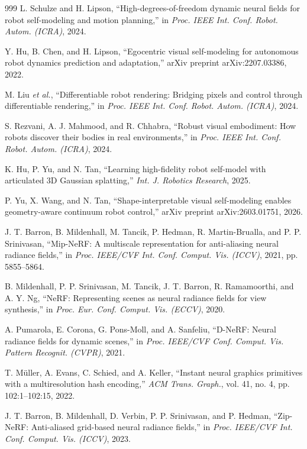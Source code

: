 \documentclass[12pt,a4paper,oneside]{report}
\begin{document}
\begin{thebibliography}{999}
L. Schulze and H. Lipson, ``High-degrees-of-freedom dynamic neural fields for robot self-modeling and motion planning,'' in \textit{Proc. IEEE Int. Conf. Robot. Autom. (ICRA)}, 2024.

Y. Hu, B. Chen, and H. Lipson, ``Egocentric visual self-modeling for autonomous robot dynamics prediction and adaptation,'' arXiv preprint arXiv:2207.03386, 2022.

M. Liu \textit{et al.}, ``Differentiable robot rendering: Bridging pixels and control through differentiable rendering,'' in \textit{Proc. IEEE Int. Conf. Robot. Autom. (ICRA)}, 2024.

S. Rezvani, A. J. Mahmood, and R. Chhabra, ``Robust visual embodiment: How robots discover their bodies in real environments,'' in \textit{Proc. IEEE Int. Conf. Robot. Autom. (ICRA)}, 2024.

K. Hu, P. Yu, and N. Tan, ``Learning high-fidelity robot self-model with articulated {3D} Gaussian splatting,'' \textit{Int. J. Robotics Research}, 2025.

P. Yu, X. Wang, and N. Tan, ``Shape-interpretable visual self-modeling enables geometry-aware continuum robot control,'' arXiv preprint arXiv:2603.01751, 2026.

J. T. Barron, B. Mildenhall, M. Tancik, P. Hedman, R. Martin-Brualla, and P. P. Srinivasan, ``{Mip-NeRF}: A multiscale representation for anti-aliasing neural radiance fields,'' in \textit{Proc. IEEE/CVF Int. Conf. Comput. Vis. (ICCV)}, 2021, pp. 5855--5864.

B. Mildenhall, P. P. Srinivasan, M. Tancik, J. T. Barron, R. Ramamoorthi, and A. Y. Ng, ``NeRF: Representing scenes as neural radiance fields for view synthesis,'' in \textit{Proc. Eur. Conf. Comput. Vis. (ECCV)}, 2020.

A. Pumarola, E. Corona, G. Pons-Moll, and A. Sanfeliu, ``D-NeRF: Neural radiance fields for dynamic scenes,'' in \textit{Proc. IEEE/CVF Conf. Comput. Vis. Pattern Recognit. (CVPR)}, 2021.

T. M\"uller, A. Evans, C. Schied, and A. Keller, ``Instant neural graphics primitives with a multiresolution hash encoding,'' \textit{ACM Trans. Graph.}, vol. 41, no. 4, pp. 102:1--102:15, 2022.

J. T. Barron, B. Mildenhall, D. Verbin, P. P. Srinivasan, and P. Hedman, ``Zip-NeRF: Anti-aliased grid-based neural radiance fields,'' in \textit{Proc. IEEE/CVF Int. Conf. Comput. Vis. (ICCV)}, 2023.


\end{thebibliography}
\end{document}
